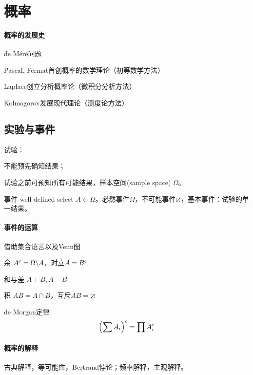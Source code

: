 \section{概率}
\paragraph{概率的发展史}
\begin{compactitem}
	\item de M\'er\'e问题
	\item Pascal, Fermat首创概率的数学理论（初等数学方法）
	\item Laplace创立分析概率论（微积分分析方法）
	\item Kolmogorov发展现代理论（测度论方法）
\end{compactitem}
\subsection{实验与事件}
试验：
\begin{compactenum}
	\item 不能预先确知结果；
	\item 试验之前可预知所有可能结果，样本空间(sample space) $\Omega$。
\end{compactenum}
事件 well-defined select $A\subset\Omega$。必然事件$\Omega$，不可能事件$\varnothing$，基本事件：试验的单一结果。

\paragraph{事件的运算}借助集合语言以及Venn图
\begin{compactitem}
	\item 余 $A^\mathrm{c} = \Omega\backslash A$，对立$A=B^\mathrm{c}$
	\item 和与差 $A+B, A-B$
	\item 积 $AB = A\cap B$，互斥$AB=\varnothing$
	\item de Morgan定律
	\[
		\left(\sum A_i\right)^\mathrm{c} = \prod A_i^\mathrm{c}
	\]
\end{compactitem}

\paragraph{概率的解释}古典解释，等可能性，Bertrand悖论；频率解释，主观解释。

